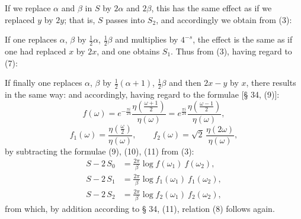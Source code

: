 
If we replace $\alpha$ and $\beta$ in $S$ by $2\alpha$ and $2\beta$, this has the
same effect as if we replaced $y$ by $2y$; that is, $S$
passes into $S_2$, and accordingly we obtain from (3):

If one replaces $\alpha$, $\beta$ by $\frac12\alpha$, $\frac12\beta$ and multiplies by $4^{-s}$, the
effect is the same as if one had replaced $x$ by $2x$, and
one obtains $S_1$. Thus from (3), having regard to (7):

If finally one replaces $\alpha$, $\beta$ by $\frac12(\alpha+1)$, $\frac12\beta$ and then
$2x-y$ by $x$, there results in the same way:
and accordingly, having regard to the formulae [§ 34, (9)]:
\[
f(\omega) = e^{-\frac{\pi i}{24}}\frac{\eta\left(\frac{\omega+1}{2}\right)}{\eta(\omega)}
= e^{\frac{\pi i}{24}}\frac{\eta\left(\frac{\omega-1}{2}\right)}{\eta(\omega)},
\]
\[
f_1(\omega) = \frac{\eta\left(\frac{\omega}{2}\right)}{\eta(\omega)}, \qquad
f_2(\omega) = \sqrt{2}\,\frac{\eta(2\omega)}{\eta(\omega)},
\]
by subtracting the formulae (9), (10), (11) from (3):
\[
\begin{aligned}
S - 2\,S_0 &= \frac{2\pi}{\beta}\log f(\omega_1)\ f(\omega_2), \\
S - 2\,S_1 &= \frac{2\pi}{\beta}\log f_1(\omega_1)\ f_1(\omega_2), \\
S - 2\,S_2 &= \frac{2\pi}{\beta}\log f_2(\omega_1)\ f_2(\omega_2),
\end{aligned}
\]
from which, by addition according to § 34, (11), relation (8) follows
again.
